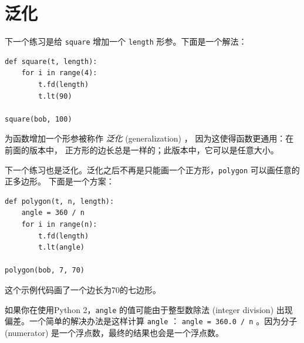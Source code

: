 \section{泛化}


下一个练习是给 \lstinline{square} 增加一个 \lstinline{length} 形参。下面是一个解法：

\begin{lstlisting}
def square(t, length):
    for i in range(4):
        t.fd(length)
        t.lt(90)

square(bob, 100)
\end{lstlisting}

%

为函数增加一个形参被称作 \emph{泛化} (generalization) ，
因为这使得函数更通用：在前面的版本中，
正方形的边长总是一样的；此版本中，它可以是任意大小。


下一个练习也是泛化。泛化之后不再是只能画一个正方形，\lstinline{polygon} 可以画任意的正多边形。 下面是一个方案：

\begin{lstlisting}
def polygon(t, n, length):
    angle = 360 / n
    for i in range(n):
        t.fd(length)
        t.lt(angle)

polygon(bob, 7, 70)
\end{lstlisting}


这个示例代码画了一个边长为70的七边形。


如果你在使用Python 2，\lstinline{angle} 的值可能由于整型数除法 (integer division) 出现偏差。一个简单的解决办法是这样计算 \lstinline{angle} ： \lstinline{angle = 360.0 / n} 。因为分子 (numerator) 是一个浮点数，最终的结果也会是一个浮点数。

